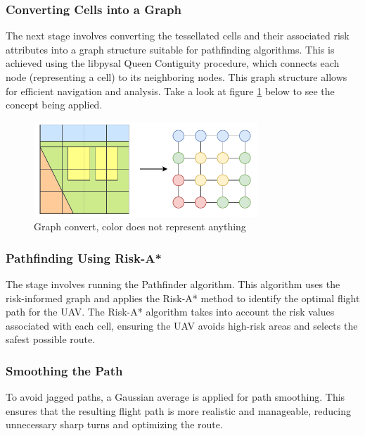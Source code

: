 \documentclass[12pt]{report}
\begin{document}
        \subsubsection{Converting Cells into a Graph}
        The next stage involves converting the tessellated cells and their associated risk attributes into a graph
        structure suitable for pathfinding algorithms. This is achieved using the libpysal Queen Contiguity procedure,
        which connects each node (representing a cell) to its neighboring nodes. This graph structure allows for
        efficient navigation and analysis. Take a look at figure \ref{fig:queen} below to see the concept being applied.

        \begin{figure}[H]
            \centering
            \includegraphics[width=0.75\textwidth]{General Image/OSM Drone-graph convert.pdf}
            \caption{Graph convert, color does not represent anything}
            \label{fig:queen}
        \end{figure}

        \subsubsection{Pathfinding Using Risk-A*}
        The stage involves running the Pathfinder algorithm. This algorithm uses the risk-informed graph and applies the
        Risk-A* method to identify the optimal flight path for the UAV. The Risk-A* algorithm takes into account the
        risk values associated with each cell, ensuring the UAV avoids high-risk areas and selects the safest possible
        route.
            
        \subsubsection{Smoothing the Path}
        To avoid jagged paths, a Gaussian average is applied for path smoothing. This ensures that the resulting flight
        path is more realistic and manageable, reducing unnecessary sharp turns and optimizing the route.
            
\end{document}
